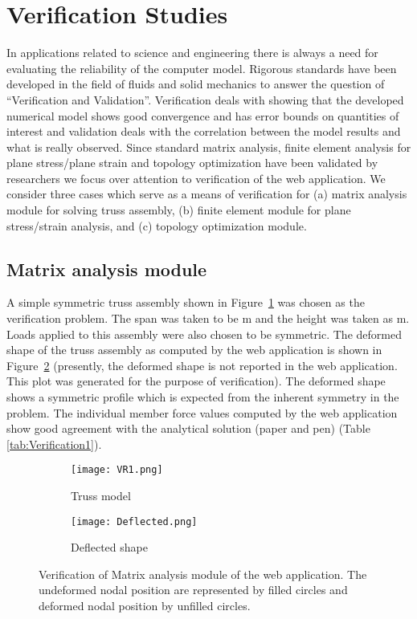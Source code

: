 \documentclass[preprint]{elsarticle}
\begin{document}
\section{Verification Studies} 
\label{Ref}
In applications related to science and engineering there is always a need for
evaluating the reliability of the computer model. Rigorous standards have been
developed in the field of fluids and solid mechanics to answer the question of
``Verification and Validation''. Verification deals with showing
that the developed numerical model shows good convergence and has error bounds
on quantities of interest and validation deals with the correlation between the
model results and what is really observed. Since standard matrix analysis,
finite element analysis for plane stress/plane strain and topology optimization
have been validated by researchers we focus over attention to verification of
the web application. We consider three cases which serve as a means of verification 
for (a) matrix analysis module for solving truss assembly, (b) finite element
module for plane stress/strain analysis, and (c) topology optimization module.

\subsection{Matrix analysis module}
A simple symmetric truss assembly shown in Figure~\ref{fig:Verification1} was
chosen as the verification problem. The span was taken to be m and the height
was taken as m. Loads applied to this assembly were also chosen to be
symmetric.
The deformed shape of the truss assembly as computed by the web application is
shown in Figure~\ref{fig:Verification1deformation} (presently, the deformed
shape is not reported in the web application. This plot was generated for the
purpose of verification). The deformed shape shows a symmetric profile which is
expected from the inherent symmetry in the problem. The individual member force
values computed by the web application show good agreement with the analytical
solution (paper and pen) (Table \ref{tab:Verification1}).

\begin{figure*}[!h]
    \centering
    \begin{subfigure}{0.475\textwidth}
        \texttt{[image: VR1.png]}
        \caption{Truss model}
        \label{fig:Verification1}
    \end{subfigure}
\begin{subfigure}{0.475\textwidth}
        \texttt{[image: Deflected.png]}
        \caption{Deflected shape}
        \label{fig:Verification1deformation}
    \end{subfigure}
\caption{Verification of Matrix analysis module of the web application. The undeformed nodal position are represented by filled circles and deformed nodal position by unfilled circles.}
\label{fig:Verification}
\end{figure*}
\end{document}
